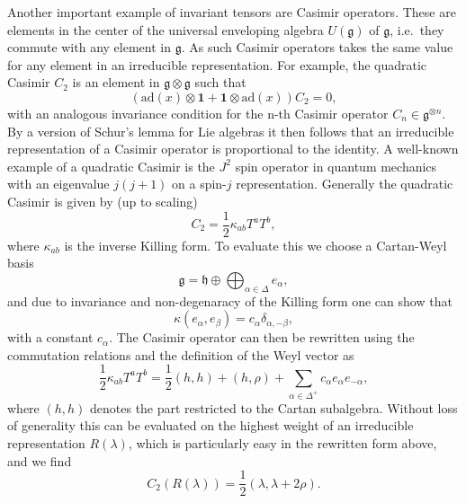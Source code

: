 Another important example of invariant tensors are Casimir operators. These are elements in the center of the universal enveloping algebra $U(\mathfrak{g})$ of $\mathfrak{g}$, i.e.\ they commute with any element in $\mathfrak{g}$. As such Casimir operators takes the same value for any element in an irreducible representation. For example, the quadratic Casimir $C_2$ is an element in $\mathfrak{g}\otimes\mathfrak{g}$ such that 
\begin{equation}
    \left(\text{ad}(x)\otimes\mathbf{1}+\mathbf{1}\otimes\text{ad}(x)\right)C_2 = 0,
\end{equation}
with an analogous invariance condition for the n-th Casimir operator $C_n\in\mathfrak{g}^{\otimes n}$. By a version of Schur's lemma for Lie algebras it then follows that an irreducible representation of a Casimir operator is proportional to the identity. A well-known example of a quadratic Casimir is the $J^2$ spin operator in quantum mechanics with an eigenvalue $j(j+1)$ on a spin-$j$ representation. Generally the quadratic Casimir is given by (up to scaling)
\begin{equation}
    C_2 = \frac{1}{2}\kappa_{ab}T^aT^b,
\end{equation}
where $\kappa_{ab}$ is the inverse Killing form. To evaluate this we choose a Cartan-Weyl basis 
\begin{equation}
    \mathfrak{g} = \mathfrak{h} \oplus\bigoplus_{\alpha\in\Delta} e_\alpha, 
\end{equation}
and due to invariance and non-degenaracy of the Killing form one can show that
\begin{equation}
    \kappa(e_\alpha,e_\beta) = c_\alpha\delta_{\alpha,-\beta},
\end{equation}
with a constant $c_\alpha$. The Casimir operator can then be rewritten using the commutation relations and the definition of the Weyl vector as 
\begin{equation}
    \frac{1}{2}\kappa_{ab}T^aT^b = \frac{1}{2}(h,h)+(h,\rho)+\sum_{\alpha\in\Delta^+}c_\alpha e_{\alpha}e_{-\alpha},
\end{equation}
where $(h,h)$ denotes the part restricted to the Cartan subalgebra. Without loss of generality this can be evaluated on the highest weight of an irreducible representation $R(\lambda)$, which is particularly easy in the rewritten form above, and we find
\begin{equation}
    C_2(R(\lambda)) = \frac{1}{2}(\lambda,\lambda+2\rho).
\end{equation}


